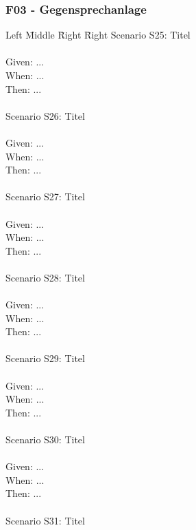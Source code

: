 \subsubsection*{F03 - Gegensprechanlage}
\begin{tabbing}
    Left \= Middle \= Right \= Right \kill
    Scenario S25: \> \> \> Titel \\ \\
    Given:  \> \> \> ...\\
    When:   \> \> \> ...\\
    Then:   \> \> \> ...\\
    \\
    Scenario S26: \> \> \> Titel \\ \\
    Given:  \> \> \> ...\\
    When:   \> \> \> ...\\
    Then:   \> \> \> ...\\
    \\
    Scenario S27: \> \> \> Titel \\ \\
    Given:  \> \> \> ...\\
    When:   \> \> \> ...\\
    Then:   \> \> \> ...\\
    \\
    Scenario S28: \> \> \> Titel \\ \\
    Given:  \> \> \> ...\\
    When:   \> \> \> ...\\
    Then:   \> \> \> ...\\
    \\
    Scenario S29: \> \> \> Titel \\ \\
    Given:  \> \> \> ...\\
    When:   \> \> \> ...\\
    Then:   \> \> \> ...\\
    \\
    Scenario S30: \> \> \> Titel \\ \\
    Given:  \> \> \> ...\\
    When:   \> \> \> ...\\
    Then:   \> \> \> ...\\
    \\
    Scenario S31: \> \> \> Titel \\ \\

\end{tabbing}
